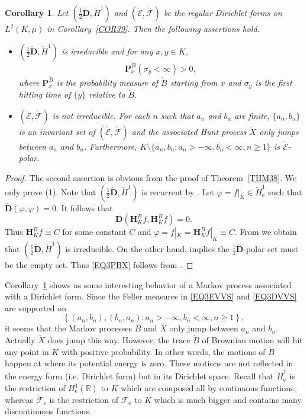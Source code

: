 \documentclass[a4paper]{amsart}
\newtheorem{corollary}[theorem]{Corollary}
\theoremstyle{definition}
\theoremstyle{remark}
\numberwithin{equation}{section}
\begin{document}
\begin{corollary}\label{COR311}
Let $(\frac{1}{2}\check{\mathbf{D}}, \check{H}^1)$ and $(\check{{\mathcal{E}}},\check{{\mathcal{F}}})$ be the regular Dirichlet forms on $L^2(K,\mu)$ in Corollary~\ref{COR39}. Then the following assertions hold.
\begin{itemize}
\item[(1)] $(\frac{1}{2}\check{\mathbf{D}}, \check{H}^1)$ is irreducible and for any $x, y\in K$,
\begin{equation}\label{EQ3PBX}
	\mathbf{P}^{\check{B}}_x(\sigma_y<\infty)>0,
\end{equation}
where $\mathbf{P}^{\check{B}}_x$ is the probability measure of $\check{B}$ starting from $x$ and $\sigma_y$ is the first hitting time of $\{y\}$ relative to $\check{B}$.
\item[(2)] $(\check{{\mathcal{E}}},\check{{\mathcal{F}}})$ is not irreducible. For each $n$ such that $a_n$ and $b_n$ are finite, $\{a_n,b_n\}$ is an invariant set of $(\check{{\mathcal{E}}},\check{{\mathcal{F}}})$ and the associated Hunt process $\check{X}$ only jumps between $a_n$ and $b_n$. Furthermore, $K\setminus \{a_n, b_n:  a_n>-\infty ,b_n<\infty, n\geq 1\}$ is $\check{{\mathcal{E}}}$-polar.
\end{itemize}
\end{corollary}
\begin{proof}
The second assertion is obvious from the proof of Theorem~\ref{THM38}. We only prove (1). Note that $(\frac{1}{2}\check{\mathbf{D}}, \check{H}^1)$ is recurrent by \cite[Theorem~5.2.5]{CF12}. Let $\varphi=f|_K\in \check{H}^1_\mathrm{e}$ such that $\check{\mathbf{D}}(\varphi, \varphi)=0$. It follows that
\[
	\mathbf{D}(\mathbf{H}^B_Kf, \mathbf{H}^B_Kf)=0.
\]
Thus $\mathbf{H}^B_Kf\equiv C$ for some constant $C$ and $\varphi=f|_{K}=\mathbf{H}^B_Kf|_K\equiv C$. From \cite[Theorem~5.2.16]{CF12} we obtain that $(\frac{1}{2}\check{\mathbf{D}}, \check{H}^1)$ is irreducible. On the other hand, \cite[Theorem~5.2.8]{CF12} implies the $\frac{1}{2}\check{\mathbf{D}}$-polar set must be the empty set. Thus \eqref{EQ3PBX} follows from \cite[Theorem~3.5.6~(1)]{CF12}.
\end{proof}

{Corollary~\ref{COR311} shows us some interesting behavior of a Markov process associated with a Dirichlet form. Since the Feller measures in \eqref{EQ3EVVS} and \eqref{EQ3DVVS} are supported on
\[
\left\{(a_n,b_n), (b_n, a_n): a_n>-\infty, b_n<\infty, n\geq 1\right\},
\]
it seems that the Markov processes $\check{B}$ and $\check{X}$ only jump  between $a_n$ and $b_n$. Actually $\check{X}$ does jump this way. However, the trace $\check{B}$ of Brownian motion will hit any point in $K$ with positive probability. In other words, the motions of $\check{B}$ happen at where its potential energy is zero. These motions are not reflected in the energy form (i.e. Dirichlet form) but in its Dirichlet space. Recall that $\check{H}^1_\mathrm{e}$ is the restriction of $H^1_\mathrm{e}(\mathbb{R})$ to $K$ which are composed all by continuous functions, whereas $\check{{\mathcal{F}}}_\mathrm{e}$ is the restriction of ${{\mathcal{F}}}_\mathrm{e}$ to $K$ which is much bigger and contains many discontinuous functions. }
\end{document}

